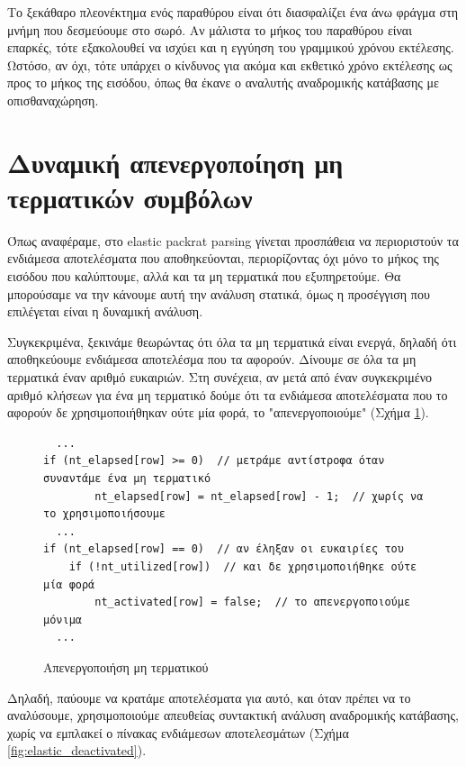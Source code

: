 Το ξεκάθαρο πλεονέκτημα ενός παραθύρου είναι ότι διασφαλίζει ένα άνω φράγμα στη μνήμη που δεσμεύουμε στο σωρό.
Αν μάλιστα το μήκος του παραθύρου είναι επαρκές, τότε εξακολουθεί να ισχύει και η εγγύηση του γραμμικού χρόνου εκτέλεσης.
Ωστόσο, αν όχι, τότε υπάρχει ο κίνδυνος για ακόμα και εκθετικό χρόνο εκτέλεσης ως προς το μήκος της εισόδου, όπως θα έκανε ο αναλυτής αναδρομικής κατάβασης με οπισθαναχώρηση.

\section{Δυναμική απενεργοποίηση μη τερματικών συμβόλων}

Όπως αναφέραμε, στο elastic packrat parsing γίνεται προσπάθεια να περιοριστούν τα ενδιάμεσα αποτελέσματα που αποθηκεύονται, περιορίζοντας όχι μόνο το μήκος της εισόδου που καλύπτουμε, αλλά και τα μη τερματικά που εξυπηρετούμε.
Θα μπορούσαμε να την κάνουμε αυτή την ανάλυση στατικά, όμως η προσέγγιση που επιλέγεται είναι η δυναμική ανάλυση.

Συγκεκριμένα, ξεκινάμε θεωρώντας ότι όλα τα μη τερματικά είναι ενεργά, δηλαδή ότι αποθηκεύουμε ενδιάμεσα αποτελέσμα που τα αφορούν.
Δίνουμε σε όλα τα μη τερματικά έναν αριθμό ευκαιριών.
Στη συνέχεια, αν μετά από έναν συγκεκριμένο αριθμό κλήσεων για ένα μη τερματικό δούμε ότι τα ενδιάμεσα αποτελέσματα που το αφορούν δε χρησιμοποιήθηκαν ούτε μία φορά, το "απενεργοποιούμε" (Σχήμα \ref{fig:elastic_deactivate}).

\begin{figure}[h]
\setlength\partopsep{-\topsep}%
\begin{verbatim}
  ...
if (nt_elapsed[row] >= 0)  // μετράμε αντίστροφα όταν συναντάμε ένα μη τερματικό 
        nt_elapsed[row] = nt_elapsed[row] - 1;  // χωρίς να το χρησιμοποιήσουμε
  ...
if (nt_elapsed[row] == 0)  // αν έληξαν οι ευκαιρίες του
    if (!nt_utilized[row])  // και δε χρησιμοποιήθηκε ούτε μία φορά
        nt_activated[row] = false;  // το απενεργοποιούμε μόνιμα
  ...
\end{verbatim}
  \caption{Απενεργοποιήση μη τερματικού}
  \label{fig:elastic_deactivate}
\end{figure}

Δηλαδή, παύουμε να κρατάμε αποτελέσματα για αυτό, και όταν πρέπει να το αναλύσουμε, χρησιμοποιούμε απευθείας συντακτική ανάλυση αναδρομικής κατάβασης, χωρίς να εμπλακεί ο πίνακας ενδιάμεσων αποτελεσμάτων (Σχήμα \ref{fig:elastic_deactivated}).

